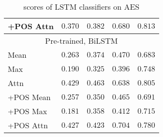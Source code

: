 \begin{table}
\begin{tabular}{lrrrr}
    +POS Attn & $0.370$ & $0.382$ & $0.680$ & $\mathbf{0.813}$ \\
    \midrule \multicolumn{5}{c}{Pre-trained, BiLSTM} \\ \midrule
    Mean & $0.263$ & $0.374$ & $0.470$ & $0.683$ \\
    Max & $0.190$ & $0.325$ & $0.396$ & $0.748$ \\
    Attn & $0.429$ & $\mathbf{0.463}$ & $0.638$ & $0.805$ \\
    +POS Mean & $0.257$ & $0.350$ & $0.465$ & $0.691$ \\
    +POS Max & $0.181$ & $0.358$ & $0.412$ & $0.715$ \\
    +POS Attn & $0.427$ & $0.423$ & $\mathbf{0.704}$ & $0.780$ \\
    \bottomrule
  \end{tabular}
  \caption{\FI scores of LSTM classifiers on AES}
  \label{tab:lstm-results}
\end{table}

